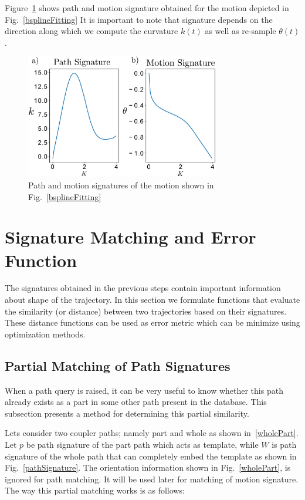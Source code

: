 \documentclass[twocolumn,10pt]{asme2e}
\begin{document}
Figure~\ref{signature} shows path and motion signature obtained for the motion depicted in Fig.~\ref{bsplineFitting}
It is important to note that signature depends on the direction along which we compute the curvature $k(t)$ as well as re-sample $\theta(t)$.

\begin{figure}
\centering
\includegraphics[width=240pt]{figure/fig_signatures.eps}
  \caption{Path and motion signatures of the motion shown in Fig.~\ref{bsplineFitting}}
\label{signature}
\end{figure}


\section{Signature Matching and Error Function}\label{sec_distanceMetric}
The signatures obtained in the previous steps contain important information about shape of the trajectory.
In this section we formulate functions that evaluate the similarity (or distance) between two trajectories based on their signatures.
These distance functions can be used as error metric which can be minimize using optimization methods.

\subsection{Partial Matching of Path Signatures}\label{sec_ncc}
When a path query is raised, it can be very useful to know whether this path already exists as a part in some other path present in the database.
This subsection presents a method for determining this partial similarity.

Lets consider two coupler paths; namely part and whole as shown in~\ref{wholePart}.
Let $p$ be path signature of the part path which acts as template, while $W$ is path signature of the whole path that can completely embed the template as shown in Fig.~\ref{pathSignature}. The orientation information shown in Fig.~\ref{wholePart}, is ignored for path matching. It will be used later for matching of motion signature.
The way this partial matching works is as follows:
\end{document}
